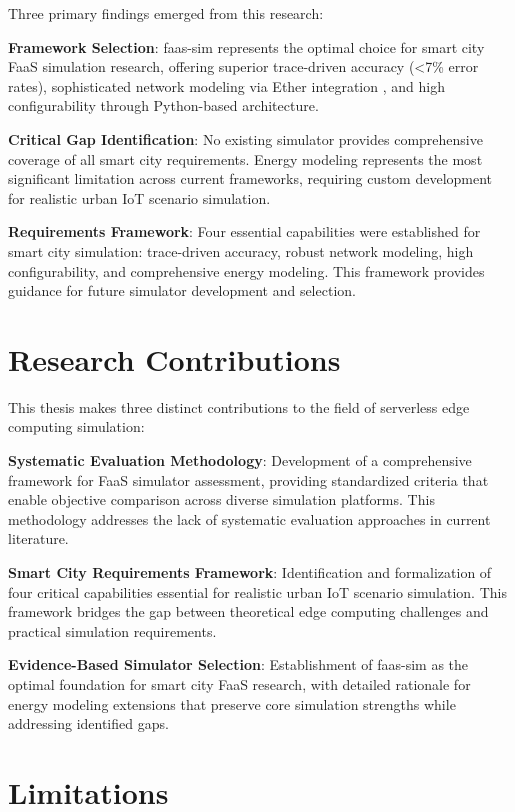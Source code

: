 Three primary findings emerged from this research:

\textbf{Framework Selection}: faas-sim represents the optimal choice for smart city FaaS simulation research, offering superior trace-driven accuracy (<7\% error rates), sophisticated network modeling via Ether integration \cite{rausch2020ether}, and high configurability through Python-based architecture.

\textbf{Critical Gap Identification}: No existing simulator provides comprehensive coverage of all smart city requirements. Energy modeling represents the most significant limitation across current frameworks, requiring custom development for realistic urban IoT scenario simulation.

\textbf{Requirements Framework}: Four essential capabilities were established for smart city simulation: trace-driven accuracy, robust network modeling, high configurability, and comprehensive energy modeling. This framework provides guidance for future simulator development and selection.

\section{Research Contributions}

This thesis makes three distinct contributions to the field of serverless edge computing simulation:

\textbf{Systematic Evaluation Methodology}: Development of a comprehensive framework for FaaS simulator assessment, providing standardized criteria that enable objective comparison across diverse simulation platforms. This methodology addresses the lack of systematic evaluation approaches in current literature.

\textbf{Smart City Requirements Framework}: Identification and formalization of four critical capabilities essential for realistic urban IoT scenario simulation. This framework bridges the gap between theoretical edge computing challenges and practical simulation requirements.

\textbf{Evidence-Based Simulator Selection}: Establishment of faas-sim as the optimal foundation for smart city FaaS research, with detailed rationale for energy modeling extensions that preserve core simulation strengths while addressing identified gaps.

\section{Limitations}

